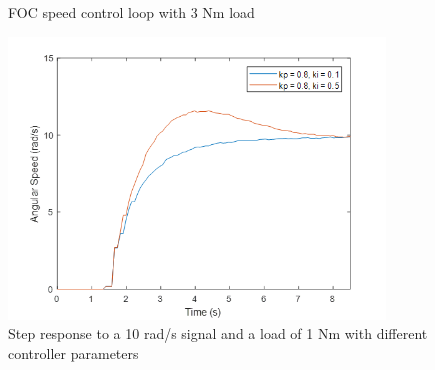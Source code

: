 \begin{figure}[h!p]
\centering

\caption{FOC speed control loop with 3 Nm load}
\end{figure}

\clearpage

\begin{figure}[h!p]
\centering
\includegraphics[width=10cm]{Images/plots/plot_8.png} 
\caption[plot8]{Step response to a 10 rad/s signal and a load of 1 Nm with different controller parameters}
\label{fig:plot8}
\end{figure}

